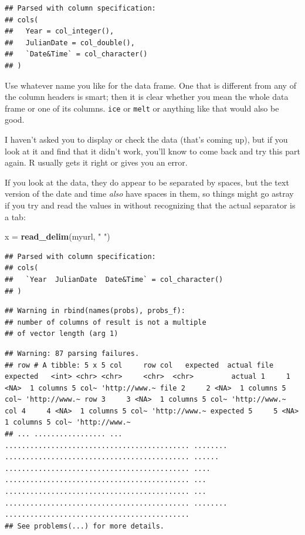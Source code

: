 \documentclass[]{tufte-book}
\newenvironment{Shaded}{}{}
\newcommand{\KeywordTok}[1]{\textcolor[rgb]{0.00,0.44,0.13}{\textbf{#1}}}
\newcommand{\NormalTok}[1]{#1}
\newcommand{\StringTok}[1]{\textcolor[rgb]{0.25,0.44,0.63}{#1}}
\theoremstyle{definition}
\theoremstyle{definition}
\theoremstyle{definition}
\theoremstyle{remark}
\begin{document}
\begin{verbatim}
## Parsed with column specification:
## cols(
##   Year = col_integer(),
##   JulianDate = col_double(),
##   `Date&Time` = col_character()
## )
\end{verbatim}

Use whatever name you like for the data frame. One that is different
from any of the column headers is smart; then it is clear whether you
mean the whole data frame or one of its columns. \texttt{ice} or
\texttt{melt} or anything like that would also be good.

I haven't asked you to display or check the data (that's coming up), but
if you look at it and find that it didn't work, you'll know to come back
and try this part again. R usually gets it right or gives you an error.

If you look at the data, they do appear to be separated by spaces, but
the text version of the date and time \emph{also} have spaces in them,
so things might go astray if you try and read the values in without
recognizing that the actual separator is a tab:

\begin{Shaded}
\begin{Highlighting}[]
\NormalTok{x =}\StringTok{ }\KeywordTok{read_delim}\NormalTok{(myurl, }\StringTok{" "}\NormalTok{)}
\end{Highlighting}
\end{Shaded}

\begin{verbatim}
## Parsed with column specification:
## cols(
##   `Year  JulianDate  Date&Time` = col_character()
## )
\end{verbatim}

\begin{verbatim}
## Warning in rbind(names(probs), probs_f):
## number of columns of result is not a multiple
## of vector length (arg 1)
\end{verbatim}

\begin{verbatim}
## Warning: 87 parsing failures.
## row # A tibble: 5 x 5 col     row col   expected  actual file          expected   <int> <chr> <chr>     <chr>  <chr>         actual 1     1 <NA>  1 columns 5 col~ 'http://www.~ file 2     2 <NA>  1 columns 5 col~ 'http://www.~ row 3     3 <NA>  1 columns 5 col~ 'http://www.~ col 4     4 <NA>  1 columns 5 col~ 'http://www.~ expected 5     5 <NA>  1 columns 5 col~ 'http://www.~
## ... ................. ... ............................................ ........ ............................................ ...... ............................................ .... ............................................ ... ............................................ ... ............................................ ........ ............................................
## See problems(...) for more details.
\end{verbatim}
\end{document}
